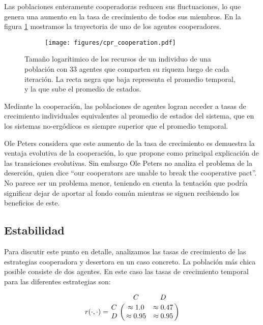 \documentclass[a4paper,10pt]{article}
\begin{document}
Las poblaciones enteramente cooperadoras reducen sus fluctuaciones, lo que genera una aumento en la tasa de crecimiento de todos sus miembros.
En la figura \ref{fig:cpr_cooperation} mostramos la trayectoria de uno de los agentes cooperadores.
\begin{figure}[H]
    \centering
    \begin{subfigure}[b]{0.45\textwidth}
    \texttt{[image: figures/cpr\_cooperation.pdf]}
    \end{subfigure}
    \caption{
    Tamaño logarítimico de los recursos de un individuo de una población con 33 agentes que comparten su riqueza luego de cada iteración.
    La recta negra que baja representa el promedio temporal, y la que sube el promedio de estados.
    }
    \label{fig:cpr_cooperation}
\end{figure}

Mediante la cooperación, las poblaciones de agentes logran acceder a tasas de crecimiento individuales equivalentes al promedio de estados del sistema, que en los sistemas no-ergódicos es siempre superior que el promedio temporal.

Ole Peters considera que este aumento de la tasa de crecimiento es demuestra la ventaja evolutiva de la cooperación, lo que propone como principal explicación de las transiciones evolutivas.
Sin embargo Ole Peters no analiza el problema de la deserción, quien dice ``our cooperators are unable to break the cooperative pact''.
No parece ser un problema menor, teniendo en cuenta la tentación que podría significar dejar de aportar al fondo común mientras se siguen recibiendo los beneficios de este.

\subsection{Estabilidad}

Para discutir este punto en detalle, analizamos las tasas de crecimiento de las estrategias cooperadora y desertora en un caso concreto.
La población más chica posible consiste de dos agentes.
En este caso las tasas de crecimiento temporal para las diferentes estrategias son:

\begin{equation}
   r(\cdot,\cdot) = \bordermatrix{ & C & D \cr
      C & \approx 1.0 & \approx 0.47 \cr
      D & \approx 0.95 & \approx 0.95 } 
\end{equation}
\end{document}
